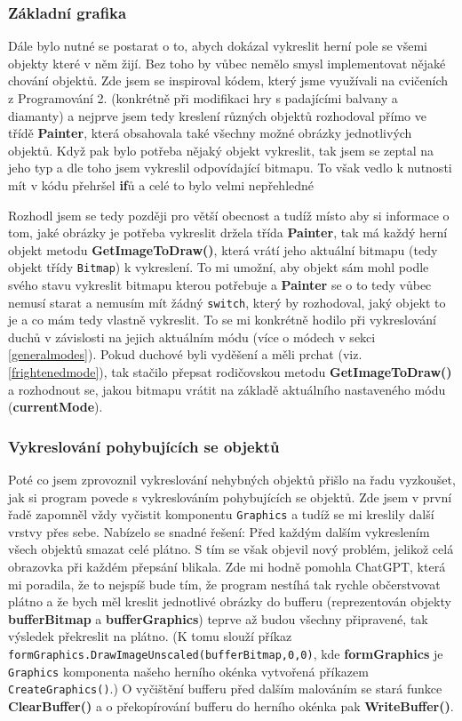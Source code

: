 \documentclass[a4]{article}
\begin{document}
\subsubsection{Základní grafika} \label{staticgraphics}
Dále bylo nutné se postarat o to, abych dokázal vykreslit herní pole se všemi objekty které v něm žijí. Bez toho by vůbec nemělo smysl implementovat nějaké chování objektů. Zde jsem se inspiroval kódem, který jsme využívali na cvičeních z Programování 2. (konkrétně při modifikaci hry s padajícími balvany a diamanty) a nejprve jsem tedy kreslení různých objektů rozhodoval přímo ve třídě \textbf{Painter}, která obsahovala také všechny možné obrázky jednotlivých objektů. Když pak bylo potřeba nějaký objekt vykreslit, tak jsem se zeptal na jeho typ a dle toho jsem vykreslil odpovídající bitmapu. To však vedlo k nutnosti mít v kódu přehršel \textbf{if}ů a celé to bylo velmi nepřehledné

Rozhodl jsem se tedy později pro větší obecnost a tudíž místo aby si informace o tom, jaké obrázky je potřeba vykreslit držela třída \textbf{Painter}, tak má každý herní objekt metodu \textbf{GetImageToDraw()}, která vrátí jeho aktuální bitmapu (tedy objekt třídy \verb|Bitmap|) k vykreslení. To mi umožní, aby objekt sám mohl podle svého stavu vykreslit bitmapu kterou potřebuje a \textbf{Painter} se o to tedy vůbec nemusí starat a nemusím mít žádný \verb|switch|, který by rozhodoval, jaký objekt to je a co mám tedy vlastně vykreslit. To se mi konkrétně hodilo při vykreslování duchů v závislosti na jejich aktuálním módu (více o módech v sekci \ref{generalmodes}). Pokud duchové byli vyděšení a měli prchat (viz. \ref{frightenedmode}), tak stačilo přepsat rodičovskou metodu \textbf{GetImageToDraw()} a rozhodnout se, jakou bitmapu vrátit na základě aktuálního nastaveného módu (\textbf{currentMode}).

\subsubsection{Vykreslování pohybujících se objektů} \label{buffering}
Poté co jsem zprovoznil vykreslování nehybných objektů přišlo na řadu vyzkoušet, jak si program povede s vykreslováním pohybujících se objektů. Zde jsem v první řadě zapomněl vždy vyčistit komponentu \verb|Graphics| a tudíž se mi kreslily další vrstvy přes sebe. Nabízelo se snadné řešení: Před každým dalším vykreslením všech objektů smazat celé plátno. S tím se však objevil nový problém, jelikož celá obrazovka při každém přepsání blikala. Zde mi hodně pomohla ChatGPT, která mi poradila, že to nejspíš bude tím, že program nestíhá tak rychle občerstvovat plátno a že bych měl kreslit jednotlivé obrázky do bufferu (reprezentován objekty \textbf{bufferBitmap} a \textbf{bufferGraphics}) teprve až budou všechny připravené, tak výsledek překreslit na plátno. (K tomu slouží příkaz \verb|formGraphics.DrawImageUnscaled(bufferBitmap,0,0)|, kde \textbf{formGraphics} je \verb|Graphics| komponenta našeho herního okénka vytvořená příkazem \verb|CreateGraphics()|.) O vyčištění bufferu před dalším malováním se stará funkce \textbf{ClearBuffer()} a o překopírování bufferu do herního okénka pak \textbf{WriteBuffer()}.
\end{document}

